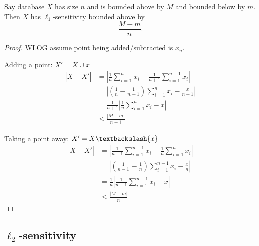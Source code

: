\documentclass[11pt]{scrartcl} %
\begin{document}
\begin{theorem}
Say database $X$ has size $n$ and is bounded above by $M$ and bounded below by $m$. Then $\bar{X}$ has $\ell_1$-sensitivity bounded above by 
$$ \frac{M-m}{n}.$$
\end{theorem}

\begin{proof}
WLOG assume point being added/subtracted is $x_n$.

Adding a point:
$X' = X \cup {x}$
\begin{align*}
\left \vert \bar{X} - \bar{X}' \right\vert &= \left\vert \frac{1}{n} \sum_{i=1}^n x_i - \frac{1}{n+1} \sum_{i=1}^{n+1} x_i \right\vert \\
	&= \left\vert \left(\frac{1}{n} - \frac{1}{n+1}\right) \sum_{i=1}^n x_i - \frac{x}{n+1}\right\vert \\
	&= \frac{1}{n+1} \left\vert \frac{1}{n} \sum_{i=1}^n x_i - x \right\vert \\
	&\le \frac{ \left\vert M - m \right\vert}{n+1}
\end{align*}

Taking a point away:
$X' = X\textbackslash\{x\}$
\begin{align*}
\left \vert \bar{X} - \bar{X}' \right\vert &= \left\vert \frac{1}{n-1} \sum_{i=1}^{n-1} x_i - \frac{1}{n} \sum_{i=1}^n x_i \right\vert \\
	&= \left\vert \left(\frac{1}{n-1} - \frac{1}{n}\right) \sum_{i=1}^{n-1} x_i - \frac{x}{n}\right\vert \\
	&= \frac{1}{n} \left\vert \frac{1}{n-1} \sum_{i=1}^{n-1} x_i  - x \right\vert \\
	&\le \frac{\left\vert M-m\right\vert}{n}
\end{align*}
\end{proof}
\subsection{$\ell_2$-sensitivity}



\end{document}

